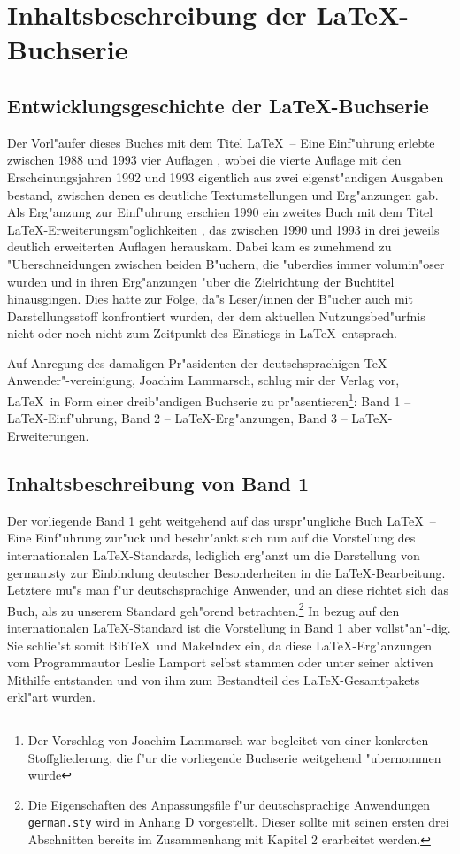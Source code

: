 \documentclass{report}
\begin{document}
\chapter{Inhaltsbeschreibung der \LaTeX-Buchserie}
\section{Entwicklungsgeschichte der \LaTeX-Buchserie}
Der Vorl"aufer dieses Buches mit dem Titel \LaTeX\ -- Eine Einf"uhrung
erlebte zwischen 1988 und 1993 vier Auflagen \cite{hku}, wobei die vierte
Auflage mit den Erscheinungsjahren 1992 und 1993 eigentlich aus zwei
eigenst"andigen Ausgaben bestand, zwischen denen es deutliche
Textumstellungen und Erg"anzungen gab. Als Erg"anzung zur Einf"uhrung
erschien 1990 ein zweites Buch mit dem Titel
\LaTeX-Erweiterungsm"oglichkeiten \cite{hkv}, das zwischen 1990 und 1993 in
drei jeweils deutlich erweiterten Auflagen herauskam. Dabei kam es zunehmend
zu "Uberschneidungen zwischen beiden B"uchern, die "uberdies immer 
volumin"oser wurden und in ihren Erg"anzungen "uber die Zielrichtung der
Buchtitel hinausgingen. Dies hatte zur Folge, da"s Leser/innen der B"ucher
auch mit Darstellungsstoff konfrontiert wurden, der dem aktuellen 
Nutzungsbed"urfnis nicht oder noch nicht zum Zeitpunkt des Einstiegs in 
\LaTeX\ entsprach.

Auf Anregung des damaligen Pr"asidenten der deutschsprachigen
\TeX-Anwender"-vereinigung, Joachim Lammarsch, schlug mir der Verlag vor,
\LaTeX\ in Form einer dreib"andigen Buchserie zu pr"asentieren\footnote{Der
Vorschlag von Joachim Lammarsch war begleitet von einer konkreten
Stoffgliederung, die f"ur die vorliegende Buchserie weitgehend "ubernommen
wurde}: 
Band 1 -- \LaTeX-Einf"uhrung, Band 2 -- \LaTeX-Erg"anzungen, Band 3 --
\LaTeX-Erweiterungen. \cite{hk}

\section{Inhaltsbeschreibung von Band 1}
Der vorliegende Band 1 \cite{hk1} geht weitgehend auf das urspr"ungliche Buch 
\LaTeX\ -- Eine Einf"uhrung \cite{hku} zur"uck und beschr"ankt sich nun
auf die Vorstellung des internationalen \LaTeX-Standards, lediglich erg"anzt
um die Darstellung von german.sty zur Einbindung deutscher 
Besonderheiten in die \LaTeX-Bearbeitung. Letztere mu"s man f"ur 
deutschsprachige Anwender, und an diese richtet sich das Buch, als zu
unserem Standard geh"orend betrachten.\footnote{Die Eigenschaften des
Anpassungsfile f"ur deutschsprachige Anwendungen \texttt{german.sty} wird
in Anhang D vorgestellt. Dieser sollte mit seinen ersten drei Abschnitten 
bereits im Zusammenhang mit Kapitel 2 erarbeitet werden.}
In bezug auf den internationalen \LaTeX-Standard ist die Vorstellung
in Band 1 aber vollst"an"-dig. Sie schlie"st somit Bib\TeX\
und MakeIndex ein, da diese \LaTeX-Erg"anzungen
vom Programmautor Leslie Lamport selbst stammen oder unter seiner
aktiven Mithilfe entstanden und von ihm zum Bestandteil des \LaTeX-Gesamtpakets 
erkl"art wurden.
\end{document}
